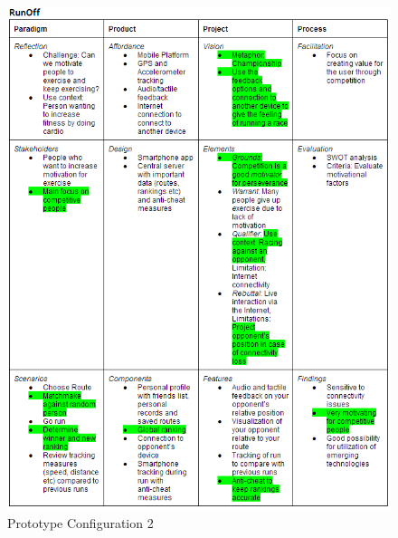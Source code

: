 \begin{figure}[ht!]
\begin{center}
 \includegraphics[width=\textwidth]{img/prototypeconfig2.png}
 \caption{Prototype Configuration 2}
  \label{fig:prototypeconfig2}
\end{center}
\end{figure}




